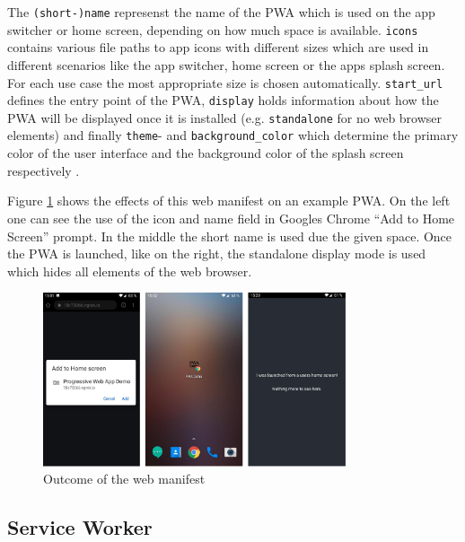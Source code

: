 \begin{center}
	\begin{minipage}{\textwidth}
		
	\end{minipage}
\end{center}

The \texttt{(short-)name} represenst the name of the PWA which is used on the app switcher or home screen, depending on how much space is available. \texttt{icons} contains various file paths to app icons with different sizes which are used in different scenarios like the app switcher, home screen or the apps splash screen. For each use case the most appropriate size is chosen automatically. \texttt{start\_url} defines the entry point of the PWA, \texttt{display} holds information about how the PWA will be displayed once it is installed (e.g. \texttt{standalone} for no web browser elements) and finally \texttt{theme}- and \texttt{background\_color} which determine the primary color of the user interface and the background color of the splash screen respectively \cite{HowMakePWAs}.

Figure \ref{fig:pwa_webmanifest} shows the effects of this web manifest on an example PWA. On the left one can see the use of the icon and name field in Googles Chrome “Add to Home Screen” prompt. In the middle the short name is used due the given space. Once the PWA is launched, like on the right, the standalone display mode is used which hides all elements of the web browser. 

\begin{figure}[htbp] 
	\centering
	\includegraphics[width=0.8\textwidth]{Assets/chapter_pwa/manifest_demo.png}
	\caption{Outcome of the web manifest}
	\label{fig:pwa_webmanifest}
\end{figure}

\subsection{Service Worker}
\label{sec:theorieCc}

